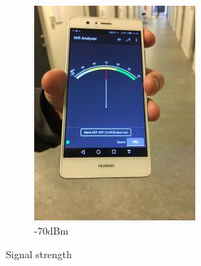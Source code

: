 \begin{figure}[h]
\begin{subfigure}{.49\textwidth}
        \includegraphics[width=\textwidth]{figures/image2.jpg} 
        \caption{-70dBm}
        \label{fig:wifitest2}
    \end{subfigure}
\caption{Signal strength}
\label{fig:wifitest12}
\end{figure}